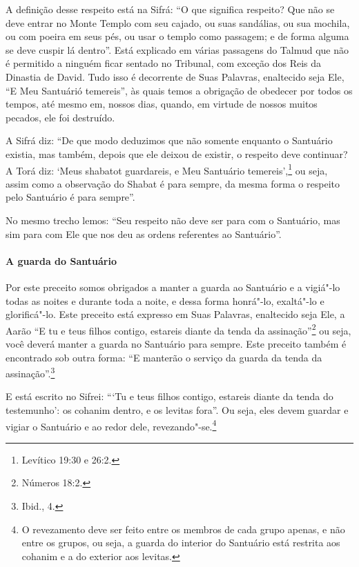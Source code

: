 \begin{multicols}{2}
A definição desse respeito está na Sifrá\starr: ``O que significa respeito?
Que não se deve entrar no Monte Templo\starr{} com seu cajado, ou suas
sandálias, ou sua mochila, ou com poeira em seus pés, ou usar o templo
como passagem; e de forma alguma se deve cuspir lá dentro''. Está
explicado em várias passagens do Talmud\starr{} que não é permitido a ninguém
ficar sentado no Tribunal, com exceção dos Reis da Dinastia de David.
Tudo isso é decorrente de Suas Palavras, enaltecido seja Ele, ``E Meu
Santuárió temereis'', às quais temos a obrigação de obedecer por todos
os tempos, até mesmo em, nossos dias, quando, em virtude de nossos
muitos pecados, ele foi destruído.

A Sifrá\starr{} diz: ``De que modo deduzimos que não somente enquanto o
Santuário existia, mas também, depois que ele deixou de existir, o
respeito deve continuar? A Torá\starr{} diz: `Meus shabatot\starr{} guardareis,
e Meu Santuário temereis',\footnote{Levítico 19:30 e 26:2.} ou seja, assim como a observação do
Shabat é para sempre, da mesma forma o respeito pelo Santuário é para
sempre''.

No mesmo trecho lemos: ``Seu respeito não deve ser para com o Santuário,
mas sim para com Ele que nos deu as ordens referentes ao Santuário''.

\paragraph{A guarda do Santuário}

Por este preceito somos obrigados a manter a guarda ao Santuário e a
vigiá"-lo todas as noites e durante toda a noite, e dessa forma honrá"-lo,
exaltá"-lo e glorificá"-lo. Este preceito está expresso em Suas Palavras,
enaltecido seja Ele, a Aarão ``E tu e teus filhos contigo, estareis
diante da tenda da assinação''\footnote{Números 18:2.} ou seja, você deverá
manter a guarda no Santuário para sempre. Este preceito também é
encontrado sob outra forma: ``E manterão o serviço da guarda da tenda da
assinação''.\footnote{Ibid., 4.}


E está escrito no Sifrei\starr: ```Tu e teus filhos contigo, estareis diante
da tenda do testemunho': os cohanim\starr{} dentro, e os levitas\starr{} fora''. Ou
seja, eles devem guardar e vigiar o Santuário e ao redor dele,
revezando"-se.\footnote{O revezamento deve ser feito entre os membros de cada grupo apenas, e
  não entre os grupos, ou seja, a guarda do interior do Santuário está
  restrita aos cohanim\starr{} e a do exterior aos levitas\starr.}


\end{multicols}
